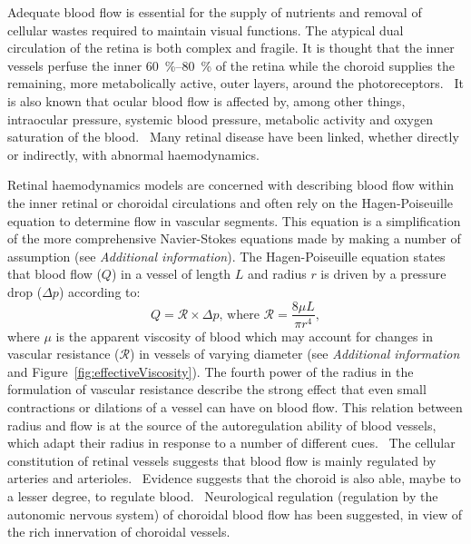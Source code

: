 \documentclass[12pt,a4paper]{journal}
\begin{document}
Adequate blood flow is essential for the supply of nutrients and removal of cellular wastes required to maintain visual functions.
The atypical dual circulation of the retina is both complex and fragile.
It is thought that the inner vessels perfuse the inner \SIrange{60}{80}{\percent} of the retina while the choroid supplies the remaining, more metabolically active, outer layers, around the photoreceptors.~\cite{Birol_2007}
It is also known that ocular blood flow is affected by, among other things, intraocular pressure, systemic blood pressure, metabolic activity and oxygen saturation of the blood.~\cite{Birol_2007,McCullough_1997,Palkovits_2014,Polska_2007,Pournaras_2008,Riva_1997,Wang_2014}
Many retinal disease have been linked, whether directly or indirectly, with abnormal haemodynamics.~\cite{Hayreh_2004,Medina_2016}

Retinal haemodynamics models are concerned with describing blood flow within the inner retinal or choroidal circulations and often rely on the Hagen-Poiseuille equation to determine flow in vascular segments.
This equation is a simplification of the more comprehensive Navier-Stokes equations made by making a number of assumption (see \textit{Additional information}).
The Hagen-Poiseuille equation states that blood flow ($Q$) in a vessel of length $L$ and radius $r$ is driven by a pressure drop ($\Delta p$) according to:
\begin{equation*}
  \label{eq:Hagen-Poiseuille}
  Q = \mathcal R\times\Delta p \mbox{, where } \mathcal{R} = \frac{8\mu L}{\pi r^4},
\end{equation*}
where $\mu$ is the apparent viscosity of blood which may account for changes in vascular resistance ($\mathcal R$) in vessels of varying diameter (see \textit{Additional information} and Figure~\ref{fig:effectiveViscosity}).
The fourth power of the radius in the formulation of vascular resistance describe the strong effect that even small contractions or dilations of a vessel can have on blood flow.
This relation between radius and flow is at the source of the autoregulation ability of blood vessels, which adapt their radius in response to a number of different cues.~\cite{Kur_2012}
The cellular constitution of retinal vessels suggests that blood flow is mainly regulated by arteries and arterioles.~\cite{An_2020,Kur_2012}
Evidence suggests that the choroid is also able, maybe to a lesser degree, to regulate blood.~\cite{Polska_2007,Riva_1997}
Neurological regulation (regulation by the autonomic nervous system) of choroidal blood flow has been suggested, in view of the rich innervation of choroidal vessels.~\cite{BeharCohen_2020,Polska_2007}
\end{document}
